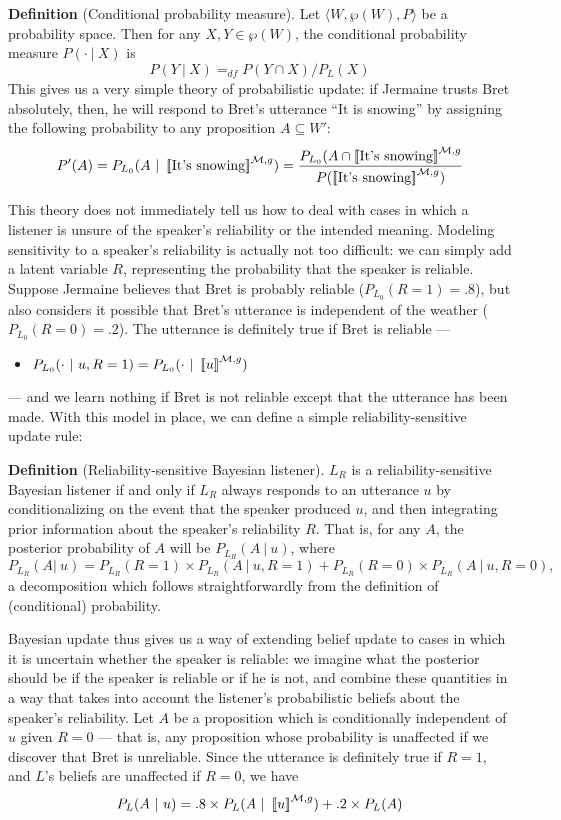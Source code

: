 \documentclass[12pt]{article}
\newcommand{\llbracket}{\ensuremath{\left [\!\left [}}%
\newcommand{\rrbracket}{\ensuremath{\right ]\!\right ]}}
\providecommand{\sv}[1]{\ensuremath{\llbracket #1 \rrbracket}}
\newcommand{\bei}{\begin{itemize}}
\newcommand{\eni}{\end{itemize}}
\newcommand{\lar}[1]{\ensuremath{\langle #1 \rangle}}
\newcounter{definition}
\newcommand{\defin}[2]{
\vspace{.1in}
\noindent \textbf{Definition \arabic{definition}} (#1). #2
\vspace{.1in}
\addtocounter{definition}{1}
}
\begin{document}
\defin{Conditional probability measure}{
Let \lar{W, \wp(W), P} be a probability space. Then for any $X, Y \in \wp(W)$, the conditional probability measure $P(\cdot \ |\ X)$ is
$$
P(Y \ |\ X) =_{\mathit{df}} P(Y \cap X) / P_L(X)
$$
This gives us a very simple theory of probabilistic update: if Jermaine trusts Bret absolutely, then, he will respond to Bret's utterance ``It is snowing'' by assigning the following probability to any proposition $A \subseteq W'$: 
$$
P'(A) = P_{L_0}(A \ |\ \sv{\text{It's snowing}}^{\mathcal{M},g}) = \frac{P_{L_0}(A \cap \sv{\text{It's snowing}}^{\mathcal{M},g}}{P(\sv{\text{It's snowing}}^{\mathcal{M},g})}
$$
}

This theory does not immediately tell us how to deal with cases in which a listener is unsure of the speaker's reliability or the intended meaning. Modeling sensitivity to a speaker's reliability is actually not too difficult: we can simply add a latent variable $R$, representing the probability that the speaker is reliable. Suppose Jermaine believes that Bret is probably reliable ($P_{L_0}(R=1) = .8$), but also considers it possible that Bret's utterance is independent of the weather ($P_{L_0}(R=0) = .2$). The utterance is definitely true if Bret is reliable --- 
\bei
\item $P_{L_0}(\cdot \ |\ u, R=1) = P_{L_0}(\cdot \ |\ \sv{u}^{\mathcal{M},g})$
\eni
--- and we learn nothing if Bret is not reliable except that the utterance has been made. With this model in place, we can define a simple reliability-sensitive update rule:

\defin{Reliability-sensitive Bayesian listener}{
$L_R$ is a reliability-sensitive Bayesian listener if and only if $L_R$ always responds to an utterance $u$ by conditionalizing on the event that the speaker produced $u$, and then integrating prior information about the speaker's reliability $R$. That is, for any $A$, the posterior probability of $A$ will be $P_{L_R}(A\ |\ u)$, where
$$
P_{L_R}(A |\ u) = P_{L_R}(R=1) \times P_{L_R}(A \ |\ u, R=1) + P_{L_R}(R=0) \times P_{L_R}(A\ |\ u, R=0),
$$
a decomposition which follows straightforwardly from the definition of (conditional) probability. 
}

Bayesian update thus gives us a way of extending belief update to cases in which it is uncertain whether the speaker is reliable: we imagine what the posterior should be if the speaker is reliable or if he is not, and combine these quantities in a way that takes into account the listener's probabilistic beliefs about the speaker's reliability. Let $A$ be a proposition which is conditionally independent of $u$ given $R=0$ --- that is, any proposition whose probability is unaffected if we discover that Bret is unreliable. Since the utterance is definitely true if $R=1$, and $L$'s beliefs are unaffected if $R=0$, we have
$$
P_L(A\ |\ u) = .8 \times P_L(A \ |\ \sv{u}^{\mathcal{M},g}) + .2 \times P_L(A)
$$
%
%
\end{document}
